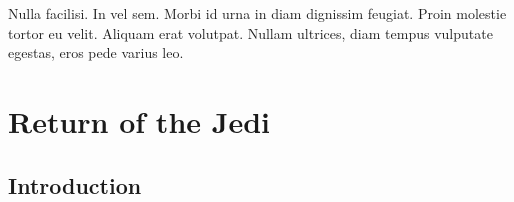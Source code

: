 \graphicspath{{figures/chapter-7/}}


\begin{savequote}[75mm]
Nulla facilisi. In vel sem. Morbi id urna in diam dignissim feugiat. Proin molestie tortor eu velit. Aliquam erat volutpat. Nullam    ultrices, diam tempus vulputate egestas, eros pede varius leo.
\end{savequote}

\chapter{Return of the Jedi}


\section{Introduction}

\lipsum[10]\cite{Lucas6}


